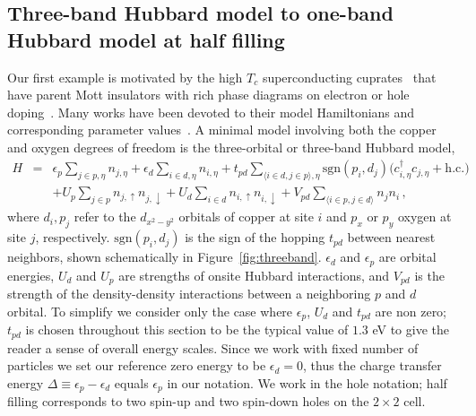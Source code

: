 \documentclass[aps, prb, 11pt]{revtex4-1}
\begin{document}
\subsection{Three-band Hubbard model to one-band Hubbard model at half filling}
\label{subsection:3band} 
Our first example is motivated by the high $T_c$ superconducting cuprates~\cite{Bednorz1986} that 
have parent Mott insulators with rich phase diagrams on electron or hole doping~\cite{Dagotto_RevModPhys, LeeWen_RevModPhys}. 
Many works have been devoted to their model Hamiltonians and corresponding parameter 
values~\cite{tJSpalek, Pavirini, Emery, ZhangRice, Hybertsen_PRB1989, Hybertsen_PRB1990, Kent_Hubbard}. 
A minimal model involving both the copper and oxygen degrees of freedom 
is the three-orbital or three-band Hubbard model, 
\begin{eqnarray}
H &=&    \epsilon_p \sum_{j\in p,\eta} n_{j,\eta} + \epsilon_{d} \sum_{i \in d,\eta}  n_{i,\eta} 
        + t_{pd} \sum_{\langle i\in d ,j \in p \rangle, \eta} \text{sgn}(p_i,d_j) \Big( c_{i,\eta}^{\dagger} c_{j,\eta} + \text{h.c.} \Big) \nonumber \\
          & &   + U_p \sum_{j\in p} n_{j,\uparrow} n_{j,\downarrow} + U_d \sum_{i\in d} n_{i,\uparrow} n_{i,\downarrow} + V_{pd} \sum_{\langle i \in p ,j \in d \rangle} n_j n_i\,,
\end{eqnarray}
where $d_i,p_j$ refer to the  $d_{x^2 - y^2}$ orbitals of copper at site $i$ and $p_x$ or $p_y$ 
oxygen at site $j$, respectively. 
$\text{sgn}(p_i,d_j)$ is the sign of the hopping $t_{pd}$ 
between nearest neighbors, shown schematically in Figure~\ref{fig:threeband}. 
$\epsilon_d$ and $\epsilon_p$ are orbital energies, $U_d$ and $U_p$ are strengths of onsite Hubbard interactions,  
and $V_{pd}$ is the strength of the density-density interactions between a neighboring $p$ and $d$ orbital. 
To simplify we consider only the case where $\epsilon_p$, $U_d$ and $t_{pd}$ are non zero; $t_{pd}$ is chosen throughout this section to be the typical value of $1.3$ eV to give the reader a sense of overall energy scales. 
Since we work with fixed number of particles we set our reference zero energy to be $\epsilon_d = 0$, thus the charge transfer energy $\Delta \equiv \epsilon_p - \epsilon_d$ equals $\epsilon_p$ in our notation. 
We work in the hole notation; half filling corresponds to two spin-up and two spin-down holes on the $2\times2$ cell.
\end{document}
